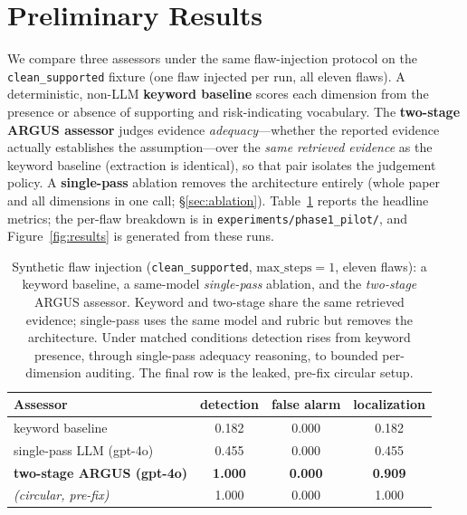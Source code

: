 \section{Preliminary Results}
\label{sec:results}

We compare three assessors under the same flaw-injection protocol on the
\texttt{clean\_supported} fixture (one flaw injected per run, all eleven flaws). A
deterministic, non-LLM \textbf{keyword baseline} scores each dimension from the
presence or absence of supporting and risk-indicating vocabulary. The
\textbf{two-stage ARGUS assessor} judges evidence \emph{adequacy}---whether the
reported evidence actually establishes the assumption---over the \emph{same
retrieved evidence} as the keyword baseline (extraction is identical), so that
pair isolates the judgement policy. A \textbf{single-pass} ablation removes the
architecture entirely (whole paper and all dimensions in one call;
\S\ref{sec:ablation}). Table~\ref{tab:results} reports the headline metrics; the
per-flaw breakdown is in \texttt{experiments/phase1\_pilot/}, and
Figure~\ref{fig:results} is generated from these runs.

\begin{table}[t]
  \centering
  \caption{Synthetic flaw injection (\texttt{clean\_supported},
  $\mathrm{max\_steps}=1$, eleven flaws): a keyword baseline, a same-model
  \emph{single-pass} ablation, and the \emph{two-stage} ARGUS assessor. Keyword
  and two-stage share the same retrieved evidence; single-pass uses the same model
  and rubric but removes the architecture. Under matched conditions detection
  rises from keyword presence, through single-pass adequacy reasoning, to bounded
  per-dimension auditing. The final row is the leaked, pre-fix circular setup.}
  \label{tab:results}
  \begin{tabular}{lccc}
    \toprule
    Assessor & detection & false alarm & localization \\
    \midrule
    keyword baseline             & 0.182 & 0.000 & 0.182 \\
    single-pass LLM (gpt-4o)     & 0.455 & 0.000 & 0.455 \\
    \textbf{two-stage ARGUS (gpt-4o)} & \textbf{1.000} & \textbf{0.000} & \textbf{0.909} \\
    \midrule
    \textit{(circular, pre-fix)} & 1.000 & 0.000 & 1.000 \\
    \bottomrule
  \end{tabular}
\end{table}

